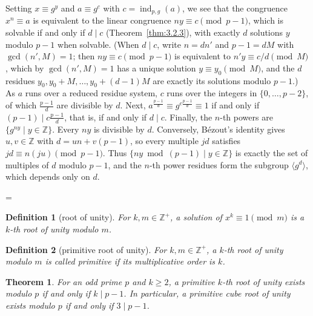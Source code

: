 \documentclass[11pt]{article}
\makeatletter
\theoremstyle{ntstyle}
\newtheorem{theorem}{Theorem}[subsection]
\newtheorem{definition}{Definition}[subsection]
\let\nt@closedisplay\]
\def\nt@guardedclose{\@ifnextchar\par{\nt@closeafterpar}{\@ifnextchar\end{\postdisplaypenalty\@M\nt@closedisplay}{\nt@closedisplay}}}
\def\nt@closeafterpar\par{\@ifnextchar\par{\nt@closeafterpar}{\@ifnextchar\end{\postdisplaypenalty\@M\nt@closedisplay\par}{\nt@closedisplay\par}}}
\renewenvironment{proof}[1][\proofname]{\par
  \pushQED{\qed}\normalfont\topsep\medskipamount\edef\nt@afterproof{\@endparpenalty=\the\@endparpenalty\relax}\@beginparpenalty\@M\@endparpenalty\@M\let\]\nt@guardedclose\trivlist\item[]\textit{#1\@addpunct{.}} \ignorespaces}{\ifvmode\addpenalty\@M\fi\popQED\nt@afterproof\endtrivlist\@endpefalse}
\DeclareMathOperator{\ind}{ind}
\makeatother
\begin{document}
\begin{proof} Setting $x \equiv g^{y}$ and $a \equiv
		g^{c}$ with $c = \ind_{p,g}(a)$, we see that the congruence $x^{n}
		\equiv a$ is equivalent to the linear congruence $ny \equiv c
		\pmod{p-1}$, which is solvable if and only if $d \mid c$ (Theorem~\ref{thm:3.2.3}), with exactly
	$d$ solutions $y$ modulo $p-1$ when solvable. (When $d \mid c$, write
		$n = d n'$ and $p - 1 = d M$ with $\gcd(n', M) = 1$; then $ny \equiv
		c \pmod{p-1}$ is equivalent to $n' y \equiv c/d \pmod{M}$, which by
	$\gcd(n', M) = 1$ has a unique solution $y \equiv y_0 \pmod{M}$, and
	the $d$ residues $y_0, y_0 + M, \ldots, y_0 + (d-1)M$ are
	exactly its solutions modulo $p-1$.) As $a$ runs over a reduced
	residue system, $c$ runs over the integers in $\{0, \ldots, p-2\}$, of which
	$\frac{p-1}{d}$ are divisible by $d$. Next, $a^{\frac{p-1}{d}}
		\equiv g^{c\frac{p-1}{d}} \equiv 1$ if and only if $(p-1) \mid c\tfrac{p-1}{d}$,
		that is, if and only if $d \mid c$. Finally, the $n$-th powers are
	$\{g^{ny} \mid y \in \mathbb{Z}\}$. Every $ny$ is divisible by $d$.
	Conversely, B{\'e}zout's identity gives $u,v\in\mathbb{Z}$ with
	$d=un+v(p-1)$, so every multiple $jd$ satisfies
	$jd\equiv n(ju)\pmod{p-1}$. Thus $\{ny\bmod(p-1) \mid y\in\mathbb{Z}\}$
	is exactly the set of multiples of $d$ modulo $p-1$, and the $n$-th
	power residues form the subgroup $\langle g^{d}\rangle$, which depends
	only on $d$.

\end{proof}
\begin{definition}[root of unity]\label{def:7.7.3}
	For $k,m\in\mathbb{Z}^+$, a solution of $x^k\equiv1\pmod{m}$ is a $k$-th root of unity modulo
	$m$.

\end{definition}
\begin{definition}[primitive root of unity]\label{def:7.7.4}
	For $k,m\in\mathbb{Z}^+$, a $k$-th root of unity modulo $m$ is called primitive if its multiplicative order is
	$k$.

\end{definition}
\begin{theorem}\label{thm:7.7.2} For
	an odd prime $p$ and $k \ge 2$, a primitive $k$-th root of unity
	exists modulo $p$ if and only if $k \mid p - 1$. In particular, a primitive cube
	root of unity exists modulo $p$ if and only if $3 \mid p - 1$.

\end{theorem}
\end{document}

